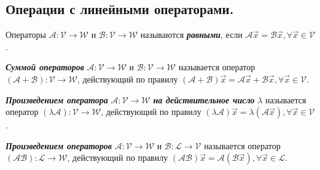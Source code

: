 \subsection{
    Операции с линейными операторами.
}

\begin{definition}
    Операторы $\mathscr{A} \colon \mathcal{V} \to \mathcal{W}$ и $\mathscr{B} \colon \mathcal{V} \to \mathcal{W}$ называются \textbf{\textit{равными}}, если $\mathscr{A}\vec{x} = \mathscr{B}\vec{x}, \forall \vec{x} \in \mathcal{V}$.
\end{definition}

\begin{definition}
    \textbf{\textit{Суммой операторов}} $\mathscr{A} \colon \mathcal{V} \to \mathcal{W}$ и $\mathscr{B} \colon \mathcal{V} \to \mathcal{W}$ называется оператор $(\mathscr{A} + \mathscr{B}) \colon \mathcal{V} \to \mathcal{W}$, действующий по правилу $(\mathscr{A} + \mathscr{B})\vec{x} = \mathscr{A}\vec{x} + \mathscr{B}\vec{x}, \forall \vec{x} \in \mathcal{V}$.
\end{definition}

\begin{definition}
    \textbf{\textit{Произведением оператора}} $\mathscr{A} \colon \mathcal{V} \to \mathcal{W}$ \textbf{\textit{на действительное число}} $\lambda$ называется оператор $(\lambda\mathscr{A}) \colon \mathcal{V} \to \mathcal{W}$, действующий по правилу $(\lambda\mathscr{A})\vec{x} = \lambda(\mathscr{A}\vec{x}), \forall \vec{x} \in \mathcal{V}$.
\end{definition}

\begin{definition}
    \textbf{\textit{Произведением операторов}} $\mathscr{A} \colon \mathcal{V} \to \mathcal{W}$ и $\mathscr{B} \colon \mathcal{L} \to \mathcal{V}$ называется оператор $(\mathscr{A}\mathscr{B}) \colon \mathcal{L} \to \mathcal{W}$, действующий по правилу $(\mathscr{A}\mathscr{B})\vec{x} = \mathscr{A}(\mathscr{B}\vec{x}), \forall \vec{x} \in \mathcal{L}$.
\end{definition}
